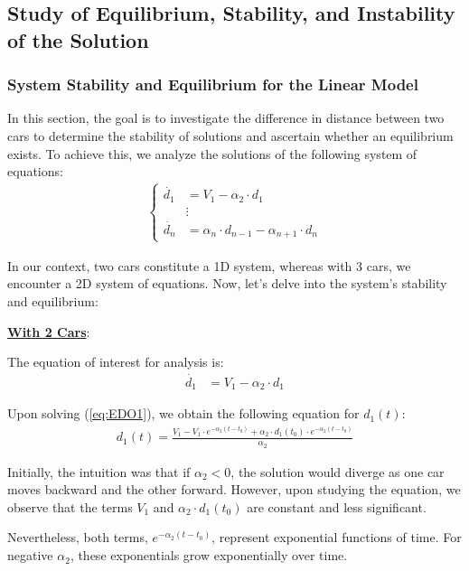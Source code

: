 \documentclass{article}
\begin{document}
		\subsection{Study of Equilibrium, Stability, and Instability of the Solution}
		\subsubsection{System Stability and Equilibrium for the Linear Model}
		In this section, the goal is to investigate the difference in distance between two cars to determine the stability of solutions and ascertain whether an equilibrium exists. To achieve this, we analyze the solutions of the following system of equations:
		\begin{align*}
			\begin{cases}
				\dot{d_1} &= V_1 - \alpha_2 \cdot d_1 \\
				&\vdots \\
				\dot{d_n} &= \alpha_n \cdot d_{n-1} - \alpha_{n+1} \cdot d_n
			\end{cases}
		\end{align*}
		
		In our context, two cars constitute a 1D system, whereas with 3 cars, we encounter a 2D system of equations. Now, let's delve into the system's stability and equilibrium: \newline
		
		\textbf{\underline{With 2 Cars}}:
		
		The equation of interest for analysis is:
		\begin{align*}
			\dot{d_1} &= V_1 - \alpha_2 \cdot d_1
		\end{align*}
		
		Upon solving (\ref{eq:EDO1}), we obtain the following equation for \(d_1(t)\):
		\begin{align*}
			\boxed{d_1(t) = \frac{{V_1 - V_1 \cdot e^{-\alpha_2(t-t_0)} + \alpha_2 \cdot d_1(t_0) \cdot e^{-\alpha_2(t-t_0)}}}{\alpha_2}}
		\end{align*}
		
		Initially, the intuition was that if \(\alpha_2 < 0\), the solution would diverge as one car moves backward and the other forward. However, upon studying the equation, we observe that the terms \(V_1\) and \(\alpha_2 \cdot d_1(t_0)\) are constant and less significant.
		
		Nevertheless, both terms, \(e^{-\alpha_2(t-t_0)}\), represent exponential functions of time. For negative \(\alpha_2\), these exponentials grow exponentially over time.
		
\end{document}
